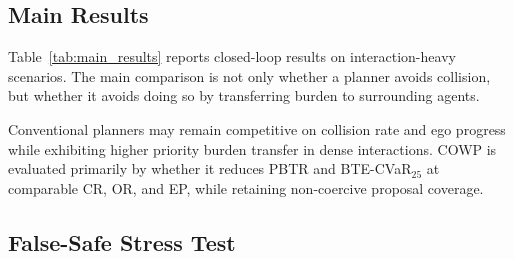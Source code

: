 \documentclass[10pt]{article}
\begin{document}
\subsection{Main Results}
\label{sec:main_results}

Table~\ref{tab:main_results} reports closed-loop results on interaction-heavy scenarios. The main comparison is not only whether a planner avoids collision, but whether it avoids doing so by transferring burden to surrounding agents.

\begin{table}[t]
\centering
\caption{Closed-loop planning performance on interaction-heavy scenarios. Standard safety is reported with CR/OR; PBTR is the primary mechanism metric. OPR and NCF-Ret must be interpreted jointly with EP.}
\label{tab:main_results}
\end{table}

Conventional planners may remain competitive on collision rate and ego progress while exhibiting higher priority burden transfer in dense interactions. COWP is evaluated primarily by whether it reduces PBTR and BTE-CVaR$_{25}$ at comparable CR, OR, and EP, while retaining non-coercive proposal coverage.

\subsection{False-Safe Stress Test}
\label{sec:false_safe_stress}
\end{document}
